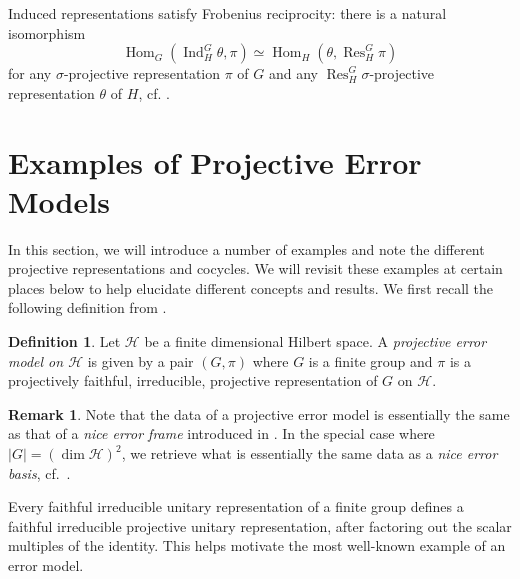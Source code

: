\documentclass[11pt]{article}
\theoremstyle{definition}
\newtheorem{definition}{Definition}
\newtheorem*{remark}{Remark}
\newcommand{\calH}{\mathcal{H}}
\newcommand{\Ind}{\operatorname{Ind}}
\newcommand{\Res}{\operatorname{Res}}
\newcommand{\Hom}{\operatorname{Hom}}
\begin{document}
Induced representations satisfy Frobenius reciprocity: there is a natural isomorphism
\begin{equation*}
    \Hom_G(\Ind_H^G\theta ,\pi) \simeq \Hom_H(\theta, \Res^G_H\pi)
\end{equation*}
for any $\sigma$-projective representation $\pi$ of $G$ and any $\Res^G_H\sigma$-projective representation $\theta$ of $H$, cf. \cite[Theorem 8.15]{CeccheriniSilbersteinTullio22}.

\section{Examples of Projective Error Models}\label{section:examples}

In this section, we will introduce a number of examples and note the different projective representations and cocycles. We will revisit these examples at certain places below to help elucidate different concepts and results. 
We first recall the following definition from \cite{Eidesen2025}.

\begin{definition}\label{def:projective error model}
    Let $\calH$ be a finite dimensional Hilbert space. A \emph{projective error model on $\calH$} is given by a pair $(G,\pi)$ where $G$ is a finite group and $\pi$ is a projectively faithful, irreducible, projective representation of $G$ on $\calH$.
\end{definition}

\begin{remark}\label{rem:relation to nice error frames/basis}
    Note that the data of a projective error model is essentially the same as that of a \emph{nice error frame} introduced in \cite{ChienWaldron17}. In the special case where $|G| = (\dim\calH)^2$, we retrieve what is essentially the same data as a \emph{nice error basis}, cf.~\cite{KnillI96, KnillII96}.
\end{remark}

Every faithful irreducible unitary representation of a finite group defines a faithful irreducible projective unitary representation, after factoring out the scalar multiples of the identity. This helps motivate the most well-known example of an error model. 
\end{document}
